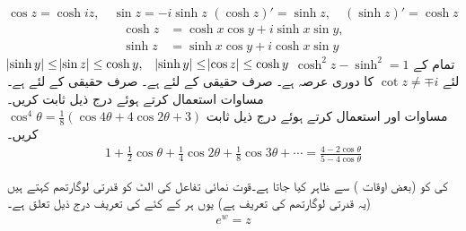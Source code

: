 \quad
$\cos z=\cosh iz,\quad \sin z=-i\sinh z$
\quad
$(\cosh z)'=\sinh z,\quad (\sinh z)'=\cosh z$
\quad
\begin{align*}
\cosh z&=\cosh x\cos y+i\sinh x\sin y,\\ 
\sinh z&=\sinh x\cos y+i\cosh x\sin y
\end{align*}
\quad
$\abs{\sinh y}\le \abs{\sin z}\le \cosh y,\quad \abs{\sinh y}\le \abs{\cos z}\le \cosh y$
\quad
$\cosh^2 z-\sinh^2=1$
\quad تمام  کے لئے 
$\cot z \ne \mp i$
\quad {} کا دوری عرصہ  ہے۔
\quad
{} صرف حقیقی  کے لئے ہے۔
\quad
{} صرف حقیقی  کے لئے ہے۔
\quad
مساوات  استعمال کرتے ہوئے درج ذیل ثابت کریں۔\\
$\cos^4 \theta=\frac{1}{8}(\cos 4\theta+4\cos 2\theta+3)$
\quad 
مساوات  اور  استعمال کرتے ہوئے درج ذیل ثابت کریں۔
\begin{align*}
1+\tfrac{1}{2}\cos \theta+\tfrac{1}{4}\cos 2\theta+\tfrac{1}{8}\cos 3\theta+\cdots=\frac{4-2\cos \theta}{5-4\cos \theta}
\end{align*}

 کی  کو  (بعض اوقات ) سے ظاہر کیا جاتا ہے۔قوت نمائی تفاعل کی الٹ کو قدرتی لوگارتھم کہتے ہیں (یہ قدرتی لوگارتھم کی تعریف ہے) یوں ہر  کے کئے   کی تعریف درج ذیل تعلق ہے۔
\begin{align}\label{مساوات_مخلوط_لوگارتھم_الف}
e^w=z
\end{align}

